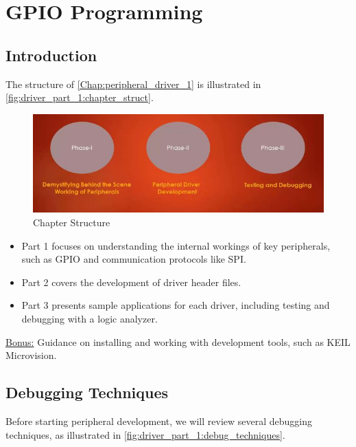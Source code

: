 
\chapter{GPIO Programming}
\label{Chap:peripheral_driver_1}

\section{Introduction}

The structure of \autoref{Chap:peripheral_driver_1} is illustrated in \autoref{fig:driver_part_1:chapter_struct}.

\begin{figure}[h]
\centering
\includegraphics[scale=0.5]{Figures/driver_part_1/chapter_struct}
\caption{Chapter Structure}
\label{fig:driver_part_1:chapter_struct}
\end{figure}

\begin{itemize}
    \item Part 1 focuses on understanding the internal workings of key peripherals, such as GPIO and communication protocols like SPI.
    \item Part 2 covers the development of driver header files.
    \item Part 3 presents sample applications for each driver, including testing and debugging with a logic analyzer.
\end{itemize}

\underline{Bonus:} Guidance on installing and working with development tools, such as KEIL Microvision.

\newpage
\section{Debugging Techniques}

Before starting peripheral development, we will review several debugging techniques, as illustrated in \autoref{fig:driver_part_1:debug_techniques}.


